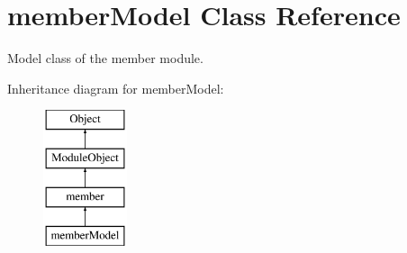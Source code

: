 \hypertarget{classmemberModel}{\section{member\-Model Class Reference}
\label{classmemberModel}
}


Model class of the member module.  


Inheritance diagram for member\-Model\-:\begin{figure}[H]
\begin{center}
\leavevmode
\includegraphics[height=4.000000cm]{classmemberModel}
\end{center}
\end{figure}
